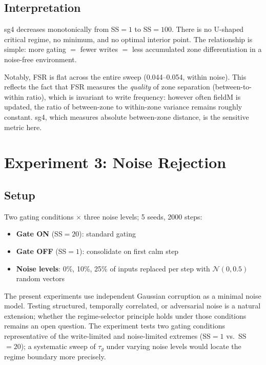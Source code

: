 \documentclass[11pt,twocolumn]{article}
\begin{document}
\subsection{Interpretation}

sg4 decreases monotonically from SS$=1$ to SS$=100$. There is no U-shaped critical
regime, no minimum, and no optimal interior point. The relationship is simple:
more gating $=$ fewer writes $=$ less accumulated zone differentiation in
a noise-free environment.

Notably, FSR is flat across the entire sweep (0.044--0.054, within noise).
This reflects the fact that FSR measures the \emph{quality} of zone separation
(between-to-within ratio), which is invariant to write frequency: however often
fieldM is updated, the ratio of between-zone to within-zone variance remains
roughly constant. sg4, which measures absolute between-zone distance, is the
sensitive metric here.

\section{Experiment 3: Noise Rejection}

\subsection{Setup}

Two gating conditions $\times$ three noise levels; 5 seeds, 2000 steps:

\begin{itemize}
  \item \textbf{Gate ON} (SS$=20$): standard gating
  \item \textbf{Gate OFF} (SS$=1$): consolidate on first calm step
  \item \textbf{Noise levels}: 0\%, 10\%, 25\% of inputs replaced per step
        with $\mathcal{N}(0, 0.5)$ random vectors
\end{itemize}

The present experiments use independent Gaussian corruption as a minimal noise model. Testing structured, temporally correlated, or adversarial noise is a natural extension; whether the regime-selector principle holds under those conditions remains an open question.
The experiment tests two gating conditions representative of the write-limited and noise-limited extremes (SS$=1$ vs.\ SS$=20$); a systematic sweep of $\tau_g$ under varying noise levels would locate the regime boundary more precisely.
\end{document}
